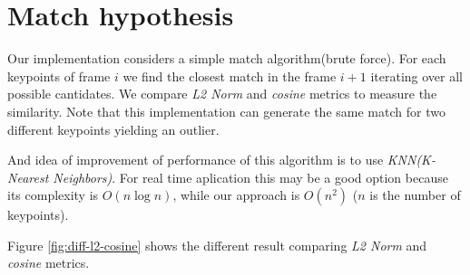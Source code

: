 \section{Match hypothesis}

Our implementation considers a simple match algorithm(brute force). For each keypoints of frame $i$ we find the closest match in the frame $i+1$ iterating over all possible cantidates. We compare \textit{L2 Norm} and \textit{cosine} metrics to measure the similarity. Note that this implementation can generate the same match for two different keypoints yielding an outlier.

And idea of improvement of performance of this algorithm is to use \textit{KNN(K-Nearest Neighbors)}. For real time aplication this may be a good option because its complexity is $O(n\log n)$, while our approach is $O(n^2)$ ($n$ is the number of keypoints).

Figure \ref{fig:diff-l2-cosine} shows the different result comparing \textit{L2 Norm} and \textit{cosine} metrics.

